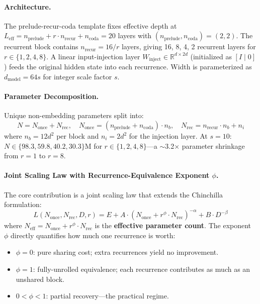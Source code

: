 \documentclass[11pt]{article}
\begin{document}
\paragraph{Architecture.}
The prelude-recur-coda template fixes effective depth at $L_{\mathrm{eff}} = n_{\mathrm{prelude}} + r \cdot n_{\mathrm{recur}} + n_{\mathrm{coda}} = 20$ layers with $(n_{\mathrm{prelude}}, n_{\mathrm{coda}}) = (2, 2)$. The recurrent block contains $n_{\mathrm{recur}} = 16/r$ layers, giving 16, 8, 4, 2 recurrent layers for $r \in \{1, 2, 4, 8\}$. A linear input-injection layer $W_{\mathrm{inject}} \in \mathbb{R}^{d \times 2d}$ (initialized as $[I \mid 0]$) feeds the original hidden state into each recurrence. Width is parameterized as $d_{\mathrm{model}} = 64s$ for integer scale factor $s$.

\paragraph{Parameter Decomposition.}
Unique non-embedding parameters split into:
\begin{equation}
    N = N_{\mathrm{once}} + N_{\mathrm{rec}}, \quad N_{\mathrm{once}} = (n_{\mathrm{prelude}} + n_{\mathrm{coda}}) \cdot n_b, \quad N_{\mathrm{rec}} = n_{\mathrm{recur}} \cdot n_b + n_i
\end{equation}
where $n_b = 12d^2$ per block and $n_i = 2d^2$ for the injection layer. At $s{=}10$: $N \in \{98.3, 59.8, 40.2, 30.3\}$M for $r \in \{1, 2, 4, 8\}$---a $\sim$3.2$\times$ parameter shrinkage from $r{=}1$ to $r{=}8$.

\paragraph{Joint Scaling Law with Recurrence-Equivalence Exponent $\phi$.}
The core contribution is a joint scaling law that extends the Chinchilla formulation:
\begin{equation}
    L(N_{\mathrm{once}}, N_{\mathrm{rec}}, D, r) = E + A \cdot \left(N_{\mathrm{once}} + r^\phi \cdot N_{\mathrm{rec}}\right)^{-\alpha} + B \cdot D^{-\beta}
\end{equation}
where $N_{\mathrm{eff}} = N_{\mathrm{once}} + r^\phi \cdot N_{\mathrm{rec}}$ is the \textbf{effective parameter count}. The exponent $\phi$ directly quantifies how much one recurrence is worth:
\begin{itemize}
    \item $\phi = 0$: pure sharing cost; extra recurrences yield no improvement.
    \item $\phi = 1$: fully-unrolled equivalence; each recurrence contributes as much as an unshared block.
    \item $0 < \phi < 1$: partial recovery---the practical regime.
\end{itemize}
\end{document}
